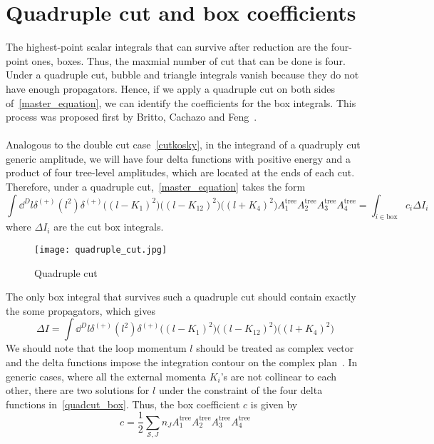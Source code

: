 \section{Quadruple cut and box coefficients}\label{sect-quadcut}
The highest-point scalar integrals that can survive after reduction are the four-point ones, \ie boxes. 
Thus, the maxmial number of cut that can be done is four. 
Under a quadruple cut, bubble and triangle integrals vanish because they do not have enough propagators.
Hence, if we apply a quadruple cut on both sides of~\cref{master_equation}, we can identify the coefficients for the box integrals.
This process was proposed first by Britto, Cachazo and Feng~\cite{Britto:2004nc}.
\\\\
Analogous to the double cut case~\cref{cutkosky}, in the integrand of a quadruply cut generic amplitude, we will have four delta functions with positive energy and a product of four tree-level amplitudes, which are located at the ends of each cut. 
Therefore, under a quadruple cut,~\cref{master_equation} takes the form
\begin{equation*}
\int\dd^D l \delta^{(+)}(l^2) \delta^{(+)}\big((l-K_1)^2\big)\big((l-K_{12})^2\big)\big((l+K_4)^2\big)
A_1^{\mathrm{tree}}A_2^{\mathrm{tree}}A_3^{\mathrm{tree}}A_4^{\mathrm{tree}}=
\int_{i\in\mathrm{box}} c_i \Delta I_i
\end{equation*}
where $\Delta I_i$ are the cut box integrals.
\begin{figure}[h]
  \centering
  \texttt{[image: quadruple\_cut.jpg]}
  \caption{Quadruple cut}
  \label{fig-quadruple_cut}
\end{figure}
The only box integral that survives such a quadruple cut should contain exactly the some propagators, which gives
\begin{equation}\label{quadcut_box}
\Delta I = \int \dd^D l \delta^{(+)}(l^2) \delta^{(+)}\big((l-K_1)^2\big)\big((l-K_{12})^2\big)\big((l+K_4)^2\big)
\end{equation}
We should note that the loop momentum $l$ should be treated as complex vector and the delta functions impose the integration contour on the complex plan~\cite{PhysRevD.75.025028, Kosower:2011ty}.
In generic cases, where all the external momenta $K_i$'s are not collinear to each other, 
there are two solutions for $l$ under the constraint of the four delta functions in~\cref{quadcut_box}. 
Thus, the box coefficient $c$ is given by
\begin{equation}\label{box_coeff}
c = \frac{1}{2}\sum_{\mathcal{S}, J}n_J A_1^{\mathrm{tree}}A_2^{\mathrm{tree}}A_3^{\mathrm{tree}}A_4^{\mathrm{tree}}
\end{equation}
